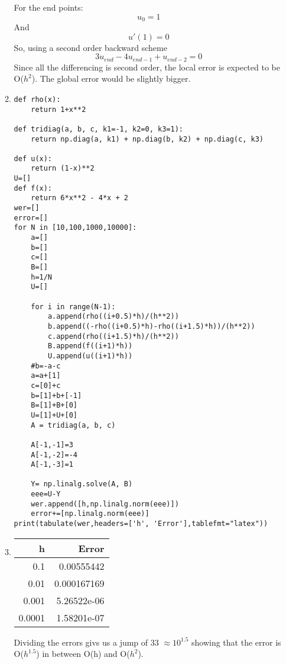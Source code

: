\documentclass[letterpaper,12pt]{article}
\begin{document}
\begin{enumerate}
\begin{enumerate}
For the end points:
\[u_0=1\]
And
\[u'(1)=0\]
So, using a second order backward scheme
\[3u_{end}-4u_{end-1}+u_{end-2}=0\]
Since all the differencing is second order, the local error is expected to be O($h^2$). The global error  would be slightly bigger.


\item

	\begin{lstlisting}[style=MyPythonstyle]
def rho(x):
    return 1+x**2
    
def tridiag(a, b, c, k1=-1, k2=0, k3=1):
    return np.diag(a, k1) + np.diag(b, k2) + np.diag(c, k3)

def u(x):
    return (1-x)**2
U=[]
def f(x):
    return 6*x**2 - 4*x + 2
wer=[]
error=[]
for N in [10,100,1000,10000]:
    a=[]
    b=[]
    c=[]
    B=[]
    h=1/N
    U=[]
    
    for i in range(N-1):
        a.append(rho((i+0.5)*h)/(h**2))
        b.append((-rho((i+0.5)*h)-rho((i+1.5)*h))/(h**2))
        c.append(rho((i+1.5)*h)/(h**2))
        B.append(f((i+1)*h))
        U.append(u((i+1)*h))
    #b=-a-c
    a=a+[1]
    c=[0]+c
    b=[1]+b+[-1]
    B=[1]+B+[0]
    U=[1]+U+[0]
    A = tridiag(a, b, c)
    
    A[-1,-1]=3
    A[-1,-2]=-4
    A[-1,-3]=1
    
    Y= np.linalg.solve(A, B)
    eee=U-Y
    wer.append([h,np.linalg.norm(eee)])
    error+=[np.linalg.norm(eee)]
print(tabulate(wer,headers=['h', 'Error'],tablefmt="latex"))
\end{lstlisting}

\item

\begin{tabular}{rr}
\hline
      h &       Error \\
\hline
 0.1    & 0.00555442  \\
 0.01   & 0.000167169 \\
 0.001  & 5.26522e-06 \\
 0.0001 & 1.58201e-07 \\
\hline
\end{tabular}

Dividing the errors givs us a jump of 33 $\approx 10^{1.5}$ showing that the error is O($h^{1.5}$) in between
 O(h) and O($h^2$).

\end{enumerate}
\end{enumerate}
\end{document}

